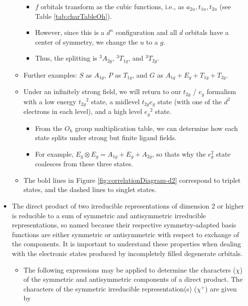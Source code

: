 \documentclass[../notes.tex]{subfiles}
\begin{document}
\begin{itemize}
\begin{itemize}
\begin{itemize}
            \item $f$ orbitals transform as the cubic functions, i.e., as $a_{2u},t_{1u},t_{2u}$ (see Table \ref{tab:charTableOh}).
            \item However, since this is a $d^n$ configuration and all $d$ orbitals have a center of symmetry, we change the $u$ to a $g$.
            \item Thus, the splitting is ${}^3A_{2g}$, ${}^3T_{1g}$, and ${}^3T_{2g}$.
        \end{itemize}
        \item Further examples: $S$ as $A_{1g}$, $P$ as $T_{1g}$, and $G$ as $A_{1g}+E_g+T_{1g}+T_{2g}$.
        \item Under an infinitely strong field, we will return to our $t_{2g}$ / $e_g$ formalism with a low energy ${t_{2g}}^2$ state, a midlevel $t_{2g}e_g$ state (with one of the $d^2$ electrons in each level), and a high level ${e_g}^2$ state.
        \begin{itemize}
            \item From the $O_h$ group multiplication table, we can determine how each state splits under strong but finite ligand fields.
            \item For example, $E_g\otimes E_g=A_{1g}+E_g+A_{2g}$, so thats why the $e_g^2$ state coalesces from these three states.
        \end{itemize}
        \item The bold lines in Figure \ref{fig:correlationDiagram-d2} correspond to triplet states, and the dashed lines to singlet states.
    \end{itemize}
    \item The direct product of two irreducible representations of dimension 2 or higher is reducible to a sum of symmetric and antisymmetric irreducible representations, so named because their respective symmetry-adapted basis functions are either symmetric or antisymmetric with respect to exchange of the components. It is important to understand these properties when dealing with the electronic states produced by incompletely filled degenerate orbitals.
    \begin{itemize}
        \item The following expressions may be applied to determine the characters ($\chi$) of the symmetric and antisymmetric components of a direct product. The characters of the symmetric irreducible representation(s) ($\chi^+$) are given by
        \begin{equation*}

\end{equation*}
\end{itemize}
\end{itemize}
\end{document}
